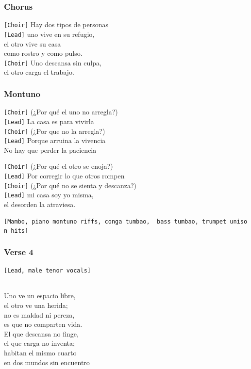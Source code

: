 \subsubsection{Chorus}\label{chorus-72}

\texttt{{[}Choir{]}} Hay dos tipos de personas\\
\texttt{{[}Lead{]}} uno vive en su refugio,\\
el otro vive su casa\\
como rostro y como pulso.\\
\texttt{{[}Choir{]}} Uno descansa sin culpa,\\
el otro carga el trabajo.

\subsubsection{Montuno}\label{montuno-1}

\texttt{{[}Choir{]}} (¿Por qué el uno no arregla?)\\
\texttt{{[}Lead{]}} La casa es para vivirla\\
\texttt{{[}Choir{]}} (¿Por que no la arregla?)\\
\texttt{{[}Lead{]}} Porque arruina la vivencia\\
No hay que perder la paciencia

\texttt{{[}Choir{]}} (¿Por qué el otro se enoja?)\\
\texttt{{[}Lead{]}} Por corregir lo que otros rompen\\
\texttt{{[}Choir{]}} (¿Por qué no se sienta y descanza?)\\
\texttt{{[}Lead{]}} mi casa soy yo misma,\\
el desorden la atraviesa.

\texttt{{[}Mambo,\ piano\ montuno\ riffs,\ conga\ tumbao,\ \ bass\ tumbao,\ trumpet\ unison\ hits{]}}

\subsubsection{Verse 4}\label{verse-4-6}

\texttt{{[}Lead,\ male\ tenor\ vocals{]}}\strut \\
Uno ve un espacio libre,\\
el otro ve una herida;\\
no es maldad ni pereza,\\
es que no comparten vida.\\
El que descansa no finge,\\
el que carga no inventa;\\
habitan el mismo cuarto\\
en dos mundos sin encuentro

